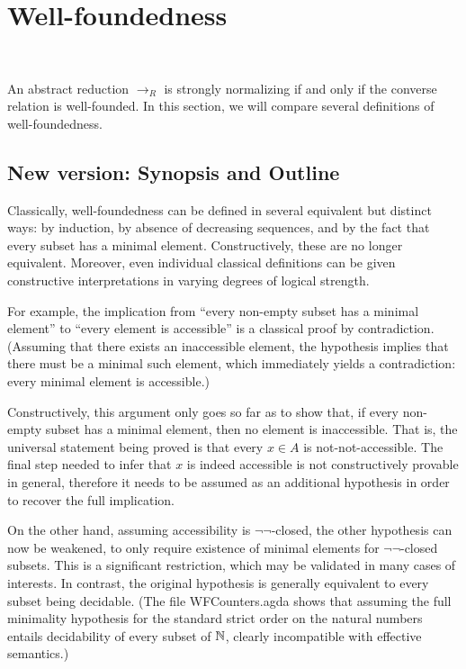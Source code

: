 \section{Well-foundedness}

\newcommand{\then}{\Longrightarrow}
\label{sec:Well-foundedness}

\newcommand{\accCor}{\textbf{accCor}}
\newcommand{\accDNE}{\textbf{accDNE}}

\\

An abstract reduction $\to_R$ is strongly normalizing
if and only if the converse relation is well-founded.
In this section, we will compare several definitions of well-foundedness.

\subsection{New version: Synopsis and Outline}

Classically, well-foundedness can be defined in several equivalent but distinct ways:
by induction, by absence of decreasing sequences, and by the fact that every
subset has a minimal element.  Constructively, these are no longer equivalent.
Moreover, even individual classical definitions can be given constructive
interpretations in varying degrees of logical strength.

For example, the implication from ``every non-empty subset has a minimal element'' to
``every element is accessible''  is a classical proof by contradiction.
(Assuming that there exists an inaccessible element, the hypothesis implies that
there must be a minimal such element, which immediately yields a contradiction:
every minimal element is accessible.)

Constructively, this argument only goes so far as to show that, if every non-empty
subset has a minimal element, then no element is inaccessible.
That is, the universal statement being proved is that every $x \in A$
is not-not-accessible. The final step needed to infer that $x$ is indeed accessible
is not constructively provable in general, therefore it needs to be assumed as
an additional hypothesis in order to recover the full implication.

On the other hand, assuming accessibility is $\lnot\lnot$-closed, the other
hypothesis can now be weakened, to only require existence of minimal elements
for $\lnot\lnot$-closed subsets.  This is a significant restriction, which may
be validated in many cases of interests.  In contrast, the original hypothesis
is generally equivalent to every subset being decidable.
(The file WFCounters.agda shows that assuming the full minimality hypothesis
for the standard strict order on the natural numbers entails decidability
of every subset of $\mathbb{N}$, clearly incompatible with effective semantics.)

